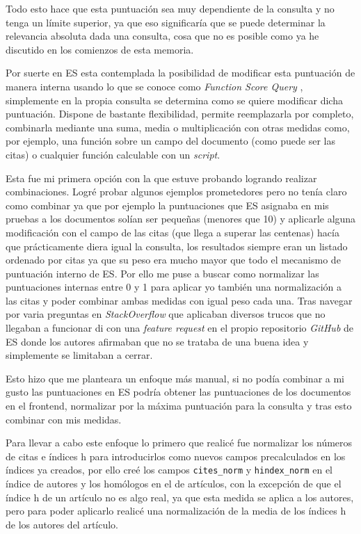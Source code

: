 Todo esto hace que esta puntuación sea muy dependiente de la consulta y no tenga un límite superior, ya que eso significaría que se puede determinar la relevancia absoluta dada una consulta, cosa que no es posible como ya he discutido en los comienzos de esta memoria. 

Por suerte en \acrshort{ES} esta contemplada la posibilidad de modificar esta puntuación de manera interna usando lo que se conoce como \textit{Function Score Query} \cite{ES_func_score}, simplemente en la propia consulta se determina como se quiere modificar dicha puntuación. Dispone de bastante flexibilidad, permite reemplazarla por completo, combinarla mediante una suma, media o multiplicación con otras medidas como, por ejemplo, una función sobre un campo del documento (como puede ser las citas) o cualquier función calculable con un \textit{script}. 

Esta fue mi primera opción con la que estuve probando logrando realizar combinaciones. Logré probar algunos ejemplos prometedores pero no tenía claro como combinar ya que por ejemplo la puntuaciones que \acrshort{ES} asignaba en mis pruebas a los documentos solían ser pequeñas (menores que 10) y aplicarle alguna modificación con el campo de las citas (que llega a superar las centenas) hacía que prácticamente diera igual la consulta, los resultados siempre eran un listado ordenado por citas ya que su peso era mucho mayor que todo el mecanismo de puntuación interno de \acrshort{ES}. Por ello me puse a buscar como normalizar las puntuaciones internas entre 0 y 1 para aplicar yo también una normalización a las citas y poder combinar ambas medidas con igual peso cada una. Tras navegar por varia preguntas en \textit{StackOverflow} que aplicaban diversos trucos que no llegaban a funcionar di con una \textit{feature request} en el propio repositorio \textit{GitHub} de \acrshort{ES} \cite{ES_normalize_score} donde los autores afirmaban que no se trataba de una buena idea y simplemente se limitaban a cerrar.

Esto hizo que me planteara un enfoque más manual, si no podía combinar a mi gusto las puntuaciones en \acrshort{ES} podría obtener las puntuaciones de los documentos en el \gls{frontend}, normalizar por la máxima puntuación para la consulta y tras esto combinar con mis medidas. 

Para llevar a cabo este enfoque lo primero que realicé fue normalizar los números de citas e índices h para introducirlos como nuevos campos precalculados en los índices ya creados, por ello creé los campos \texttt{cites\_norm} y \texttt{hindex\_norm} en el índice de autores y los homólogos en el de artículos, con la excepción de que el índice h de un artículo no es algo real, ya que esta medida se aplica a los autores, pero para poder aplicarlo realicé una normalización de la media de los índices h de los autores del artículo.

